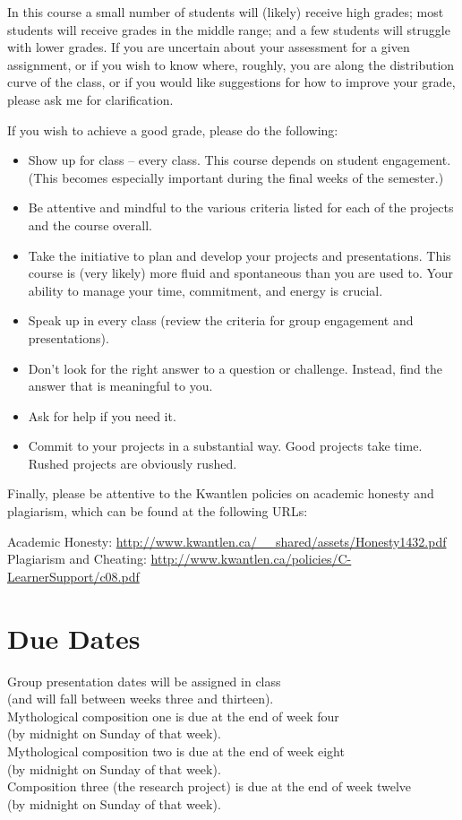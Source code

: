 \documentclass[letterpaper,10pt,headsepline]{scrreprt}
\begin{document}
In this course a small number of students will (likely) receive high grades; most students will receive grades in the middle range; and a few students will struggle with lower grades. If you are uncertain about your assessment for a given assignment, or if you wish to know where, roughly, you are along the distribution curve of the class, or if you would like suggestions for how to improve your grade, please ask me for clarification.

If you wish to achieve a good grade, please do the following:

\begin{itemize}
\item Show up for class -- every class. This course depends on student engagement. (This becomes especially important during the final weeks of the semester.)
\item Be attentive and mindful to the various criteria listed for each of the projects and the course overall.
\item Take the initiative to plan and develop your projects and presentations. This course is (very likely) more fluid and spontaneous than you are used to. Your ability to manage your time, commitment, and energy is crucial.
\item Speak up in every class (review the criteria for group engagement and presentations).
\item Don't look for the right answer to a question or challenge. Instead, find the answer that is meaningful to you.
\item Ask for help if you need it.
\item Commit to your projects in a substantial way. Good projects take time. Rushed projects are obviously rushed.
\end{itemize}

Finally, please be attentive to the Kwantlen policies on academic honesty and plagiarism, which can be found at the following URLs:

\noindent
Academic Honesty: \url{http://www.kwantlen.ca/__shared/assets/Honesty1432.pdf}\\
Plagiarism and Cheating: \url{http://www.kwantlen.ca/policies/C-LearnerSupport/c08.pdf}
\clearpage
\section{Due Dates}

Group presentation dates will be assigned in class \\(and will fall between weeks three and thirteen).
\noindent\\
Mythological composition one is due at the end of week four \\(by midnight on Sunday of that week).
\noindent\\
Mythological composition two is due at the end of week eight \\(by midnight on Sunday of that week).
\noindent\\
Composition three (the research project) is due at the end of week twelve \\(by midnight on Sunday of that week).
\end{document}

